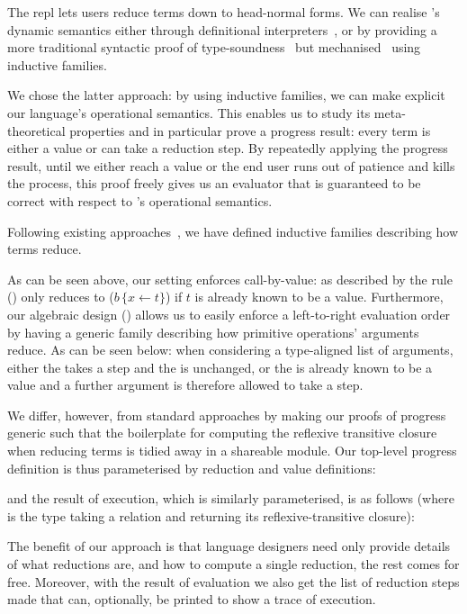The \Velo{} \acs*{repl} lets users reduce terms down to head-normal forms.
%
We can realise \Velo{}'s dynamic semantics either through definitional
interpreters~\cite{10.1145/3093333.3009866,Augustsson1999edt},
or by providing a more traditional syntactic proof of
type-soundness~\cite{DBLP:journals/iandc/WrightF94}
but mechanised~\cite[Part 2: Properties]{plfa22.08} using inductive families.

We chose the latter approach: by using inductive families, we can make explicit
our language's operational semantics.
%
This enables us to study its meta-theoretical properties and in particular prove
a progress result: every term is either a value or can take a reduction step.
%
By repeatedly applying the progress result, until we either reach a value or the end
user runs out of patience and kills the process, this proof freely gives us an
evaluator that is guaranteed to be correct with respect to \Velo{}'s operational
semantics.

Following existing approaches~\cite[Part 2: Properties]{plfa22.08}, we have defined
inductive families describing how terms reduce.


As can be seen above, our setting enforces call-by-value:
as described by the rule 
() only reduces to
($b \, \lbrace x \leftarrow t \rbrace$)
if $t$ is already known to be a value.
%
Furthermore, our algebraic design () allows
us to easily enforce a left-to-right evaluation order by having a generic
family describing how primitive operations' arguments reduce.
%
As can be seen below: when considering a type-aligned list of arguments,
either the  takes a step and the  is unchanged,
or the  is already known to be a value and a further argument
is therefore allowed to take a step.


We differ, however, from standard approaches by making our proofs of progress generic
such that the boilerplate for computing the reflexive transitive closure
when reducing terms is tidied away in a shareable module.
%
Our top-level progress definition is thus parameterised by reduction and value definitions:


\noindent
and the result of execution, which is similarly parameterised, is as follows
(where  is the type taking a relation and returning its
reflexive-transitive closure):


The benefit of our approach is that language designers need only provide details of
what reductions are,
and how to compute a single reduction, the rest comes for free.
%
Moreover, with the result of evaluation we also get the list of reduction steps made that can, optionally, be printed to show a trace of execution.

